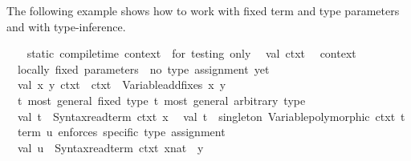 \begin{isabellebody}
\begin{isamarkuptext}
\begin{description}
  \end{description}%
\end{isamarkuptext}%
\isamarkuptrue%
%
\endisatagmlref
{\isafoldmlref}%
%
\isadelimmlref
%
\endisadelimmlref
%
\isadelimmlex
%
\endisadelimmlex
%
\isatagmlex
%
\begin{isamarkuptext}%
The following example shows how to work with fixed term
  and type parameters and with type-inference.%
\end{isamarkuptext}%
\isamarkuptrue%
%
\endisatagmlex
{\isafoldmlex}%
%
\isadelimmlex
%
\endisadelimmlex
%
\isadelimML
%
\endisadelimML
%
\isatagML
{}\isamarkupfalse%
\ {\isacharverbatimopen}\isanewline
\ \ {\isacharparenleft}{\isacharasterisk}static\ compile{\isacharminus}time\ context\ {\isacharminus}{\isacharminus}\ for\ testing\ only{\isacharasterisk}{\isacharparenright}\isanewline
\ \ val\ ctxt{}\ {\isacharequal}\ %
\isaantiq
context%
\endisaantiq
{\isacharsemicolon}\isanewline
\isanewline
\ \ {\isacharparenleft}{\isacharasterisk}locally\ fixed\ parameters\ {\isacharminus}{\isacharminus}\ no\ type\ assignment\ yet{\isacharasterisk}{\isacharparenright}\isanewline
\ \ val\ {\isacharparenleft}{\isacharbrackleft}x{\isacharcomma}\ y{\isacharbrackright}{\isacharcomma}\ ctxt{}{\isacharparenright}\ {\isacharequal}\ ctxt{}\ {\isacharbar}{\isachargreater}\ Variable{\isachardot}add{\isacharunderscore}fixes\ {\isacharbrackleft}{\isachardoublequote}x{\isachardoublequote}{\isacharcomma}\ {\isachardoublequote}y{\isachardoublequote}{\isacharbrackright}{\isacharsemicolon}\isanewline
\isanewline
\ \ {\isacharparenleft}{\isacharasterisk}t{}{\isacharcolon}\ most\ general\ fixed\ type{\isacharsemicolon}\ t{}{\isacharprime}{\isacharcolon}\ most\ general\ arbitrary\ type{\isacharasterisk}{\isacharparenright}\isanewline
\ \ val\ t{}\ {\isacharequal}\ Syntax{\isachardot}read{\isacharunderscore}term\ ctxt{}\ {\isachardoublequote}x{\isachardoublequote}{\isacharsemicolon}\isanewline
\ \ val\ t{}{\isacharprime}\ {\isacharequal}\ singleton\ {\isacharparenleft}Variable{\isachardot}polymorphic\ ctxt{}{\isacharparenright}\ t{}{\isacharsemicolon}\isanewline
\isanewline
\ \ {\isacharparenleft}{\isacharasterisk}term\ u\ enforces\ specific\ type\ assignment{\isacharasterisk}{\isacharparenright}\isanewline
\ \ val\ u\ {\isacharequal}\ Syntax{\isachardot}read{\isacharunderscore}term\ ctxt{}\ {\isachardoublequote}{\isacharparenleft}x{\isacharcolon}{\isacharcolon}nat{\isacharparenright}\ {\isasymequiv}\ y{\isachardoublequote}{\isacharsemicolon}\isanewline

\end{isabellebody}
